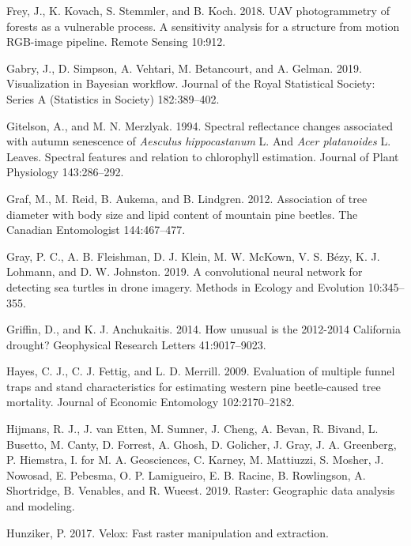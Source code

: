 \documentclass[]{article}
\begin{document}
\leavevmode\hypertarget{ref-frey2018}{}%
Frey, J., K. Kovach, S. Stemmler, and B. Koch. 2018. UAV photogrammetry
of forests as a vulnerable process. A sensitivity analysis for a
structure from motion RGB-image pipeline. Remote Sensing 10:912.

\leavevmode\hypertarget{ref-gabry2019}{}%
Gabry, J., D. Simpson, A. Vehtari, M. Betancourt, and A. Gelman. 2019.
Visualization in Bayesian workflow. Journal of the Royal Statistical
Society: Series A (Statistics in Society) 182:389--402.

\leavevmode\hypertarget{ref-gitelson1994}{}%
Gitelson, A., and M. N. Merzlyak. 1994. Spectral reflectance changes
associated with autumn senescence of \emph{Aesculus hippocastanum} L.
And \emph{Acer platanoides} L. Leaves. Spectral features and relation to
chlorophyll estimation. Journal of Plant Physiology 143:286--292.

\leavevmode\hypertarget{ref-graf2012}{}%
Graf, M., M. Reid, B. Aukema, and B. Lindgren. 2012. Association of tree
diameter with body size and lipid content of mountain pine beetles. The
Canadian Entomologist 144:467--477.

\leavevmode\hypertarget{ref-gray2019}{}%
Gray, P. C., A. B. Fleishman, D. J. Klein, M. W. McKown, V. S. Bézy, K.
J. Lohmann, and D. W. Johnston. 2019. A convolutional neural network for
detecting sea turtles in drone imagery. Methods in Ecology and Evolution
10:345--355.

\leavevmode\hypertarget{ref-griffin2014}{}%
Griffin, D., and K. J. Anchukaitis. 2014. How unusual is the 2012-2014
California drought? Geophysical Research Letters 41:9017--9023.

\leavevmode\hypertarget{ref-hayes2009}{}%
Hayes, C. J., C. J. Fettig, and L. D. Merrill. 2009. Evaluation of
multiple funnel traps and stand characteristics for estimating western
pine beetle-caused tree mortality. Journal of Economic Entomology
102:2170--2182.

\leavevmode\hypertarget{ref-hijmans2019}{}%
Hijmans, R. J., J. van Etten, M. Sumner, J. Cheng, A. Bevan, R. Bivand,
L. Busetto, M. Canty, D. Forrest, A. Ghosh, D. Golicher, J. Gray, J. A.
Greenberg, P. Hiemstra, I. for M. A. Geosciences, C. Karney, M.
Mattiuzzi, S. Mosher, J. Nowosad, E. Pebesma, O. P. Lamigueiro, E. B.
Racine, B. Rowlingson, A. Shortridge, B. Venables, and R. Wueest. 2019.
Raster: Geographic data analysis and modeling.

\leavevmode\hypertarget{ref-hunziker2017}{}%
Hunziker, P. 2017. Velox: Fast raster manipulation and extraction.
\end{document}
